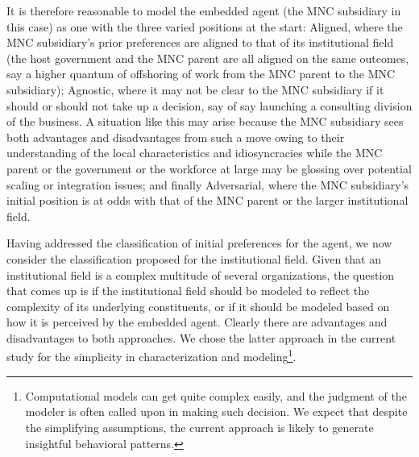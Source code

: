 \documentclass[12pt,letterpaper]{article}
\begin{document}
It is therefore reasonable to model the embedded agent (the MNC subsidiary in this case) as one with the three varied positions at the start: Aligned, where the MNC subsidiary's prior preferences are aligned to that of its institutional field (the host government and the MNC parent are all aligned on the same outcomes, say a higher quantum of offshoring of work from the MNC parent to the MNC subsidiary); Agnostic, where it may not be clear to the MNC subsidiary if it should or should not take up a decision, say of say launching a consulting division of the business. A situation like this may arise because the MNC subsidiary sees both advantages and disadvantages from such a move owing to their understanding of the local characteristics and idiosyncracies while the MNC parent or the government or the workforce at large may be glossing over potential scaling or integration issues; and finally Adversarial, where the MNC subsidiary's initial position is at odds with that of the MNC parent or the larger institutional field.  

Having addressed the classification of initial preferences for the agent, we now consider the classification proposed for the institutional field. Given that an institutional field is a complex multitude of several organizations, the question that comes up is if the institutional field should be modeled to reflect the complexity of its underlying constituents, or if it should be modeled based on how it is perceived by the embedded agent. Clearly there are advantages and disadvantages to both approaches. We chose the latter approach in the current study for the simplicity in characterization and modeling\footnote{Computational models can get quite complex easily, and the judgment of the modeler is often called upon in making such decision. We expect that despite the simplifying assumptions, the current approach is likely to generate insightful behavioral patterns.}. 
\end{document}
